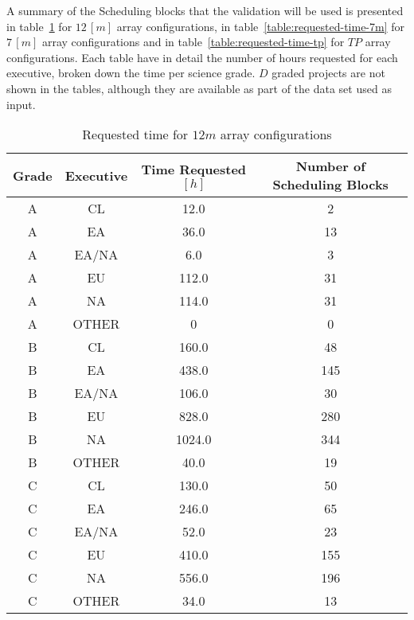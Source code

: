 A summary of the Scheduling blocks that the validation will be used is presented in table~\ref{table:requested-time-12m} for $12\,[m]$ array configurations, in table~\ref{table:requested-time-7m} for $7\,[m]$ array configurations and in table~\ref{table:requested-time-tp} for $TP$  array configurations. Each table have in detail the number of hours requested for each executive, broken down the time per science grade. $D$ graded projects are not shown in the tables, although they are available as part of the data set used as input.

\begin{table}
\begin{center}
\begin{tabular}{|c|c|c|c|}
\hline
\textbf{Grade} & \textbf{Executive} & \textbf{Time Requested $[h]$} & \textbf{Number of Scheduling Blocks} \\ \hline
A &	CL		& 12.0  & 2 \\ \hline
A &	EA		& 36.0  & 13 \\ \hline
A &	EA/NA	& 6.0   & 3 \\ \hline
A & EU      & 112.0 & 31 \\ \hline 
A &	NA		& 114.0	& 31 \\ \hline
A & OTHER	& 0		& 0 \\ \hline
B  & CL 	& 160.0		& 48  \\ \hline
B  & EA     & 438.0     & 145 \\ \hline
B  & EA/NA  & 106.0     & 30  \\ \hline
B  & EU     & 828.0     & 280 \\ \hline
B  & NA     & 1024.0    & 344 \\ \hline
B  & OTHER  & 40.0      & 19  \\ \hline
C  & CL     & 130.0     & 50  \\ \hline
C  & EA     & 246.0     & 65  \\ \hline
C  & EA/NA  & 52.0      & 23  \\ \hline
C  & EU     & 410.0     & 155 \\ \hline
C  & NA     & 556.0     & 196 \\ \hline
C  & OTHER  & 34.0      & 13  \\ \hline
\end{tabular}
\end{center}
\caption{Requested time for $12m$ array configurations}
\label{table:requested-time-12m}
\end{table}

